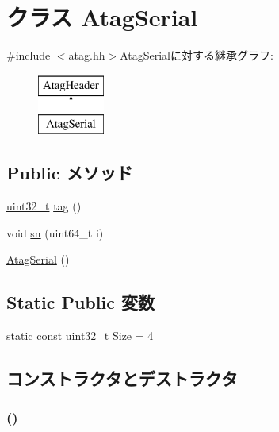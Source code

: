 \hypertarget{classAtagSerial}{
\section{クラス AtagSerial}
\label{classAtagSerial}
}


{\ttfamily \#include $<$atag.hh$>$}AtagSerialに対する継承グラフ:\begin{figure}[H]
\begin{center}
\leavevmode
\includegraphics[height=2cm]{classAtagSerial}
\end{center}
\end{figure}
\subsection*{Public メソッド}
\begin{DoxyCompactItemize}
\item 
\hyperlink{Type_8hh_a435d1572bf3f880d55459d9805097f62}{uint32\_\-t} \hyperlink{classAtagSerial_afe29fbb80b1d2765e37e98c6d259ea52}{tag} ()
\item 
void \hyperlink{classAtagSerial_a02ff72ae6f344cd5693c2db7911e05e7}{sn} (uint64\_\-t i)
\item 
\hyperlink{classAtagSerial_af5c6304e46d6fb7c9632fb991729943b}{AtagSerial} ()
\end{DoxyCompactItemize}
\subsection*{Static Public 変数}
\begin{DoxyCompactItemize}
\item 
static const \hyperlink{Type_8hh_a435d1572bf3f880d55459d9805097f62}{uint32\_\-t} \hyperlink{classAtagSerial_a7ecea14dd0f3277e19580d4509fafdba}{Size} = 4
\end{DoxyCompactItemize}


\subsection{コンストラクタとデストラクタ}
\hypertarget{classAtagSerial_af5c6304e46d6fb7c9632fb991729943b}{
\subsubsection[{AtagSerial}]{ ()}}
\label{classAtagSerial_af5c6304e46d6fb7c9632fb991729943b}




